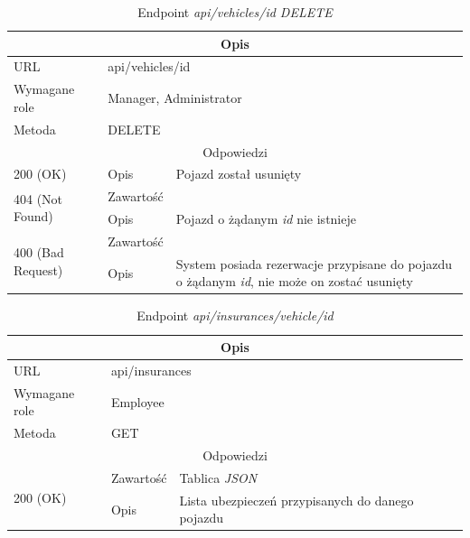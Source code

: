 \documentclass[eng,printmode,openany]{mgr}
\begin{document}
\begin{table}[H]
	\caption{Endpoint \textit{api/vehicles/id DELETE}}
	\begin{tabularx}{\textwidth}{|l|l|X|}
		\hline
		\multicolumn{3}{|c|}{Opis}
		\\ \hline
		URL                       & \multicolumn{2}{l|}{api/vehicles/id}
		\\ \hline
		Wymagane role             & \multicolumn{2}{l|}{Manager, Administrator}
		\\ \hline
		Metoda                    & \multicolumn{2}{l|}{DELETE}
		\\ \hline
		\multicolumn{3}{|c|}{Odpowiedzi}
		\\ \hline
		200 (OK)			                & Opis         	& Pojazd został usunięty
		\\ \hline
		\multirow{2}{*}{404 (Not Found)} 	& Zawartość     &    	
		\\ \cline{2-3}                      & Opis          & Pojazd o żądanym \textit{id} nie istnieje
		\\ \hline
		\multirow{2}{*}{400 (Bad Request)} 	& Zawartość     &    	
		\\ \cline{2-3}                      & Opis          & System posiada rezerwacje przypisane do pojazdu o żądanym \textit{id}, nie może on zostać usunięty
		\\ \hline
	\end{tabularx}
\end{table}

\begin{table}[H]
	\caption{Endpoint \textit{api/insurances/vehicle/id}}
	\begin{tabularx}{\textwidth}{|l|l|X|}
		\hline
		\multicolumn{3}{|c|}{Opis}
		\\ \hline
		URL                         & \multicolumn{2}{l|}{api/insurances}
		\\ \hline
		Wymagane role               & \multicolumn{2}{l|}{Employee}
		\\ \hline
		Metoda                      & \multicolumn{2}{l|}{GET}
		\\ \hline
		\multicolumn{3}{|c|}{ Odpowiedzi}
		\\ \hline
		\multirow{2}{*}{200 (OK)}   & Zawartość         & Tablica \textit{JSON}
		\\ \cline{2-3}              & Opis         	    & Lista ubezpieczeń przypisanych do danego pojazdu
		\\ \hline
	\end{tabularx}
\end{table}
\end{document}
